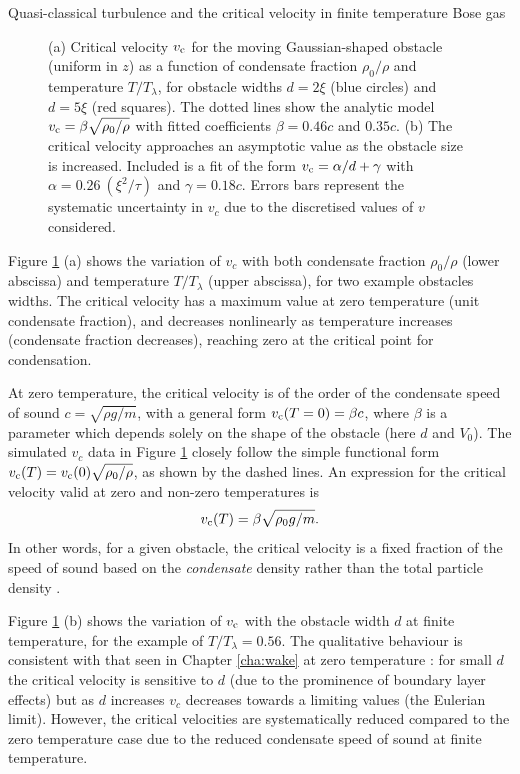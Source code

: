 \begin{chapter}{\label{cha:nonequib}Quasi-classical turbulence and the critical velocity in finite temperature Bose gas}
\begin{figure}
\begin{center}
\end{center}
  \caption{\label{fig:vc-n0}(a) Critical velocity $v_{\rm c}$ for the moving Gaussian-shaped obstacle (uniform in $z$) as a function of condensate fraction $\rho_0/\rho$ and temperature $T/T_\lambda$, for obstacle widths $d=2\xi$ (blue circles) and $d=5\xi$ (red squares). The dotted lines show the analytic model $v_{\rm c}=\beta \sqrt{\rho_0/\rho}$ with fitted coefficients $\beta=0.46c$ and $0.35c$. (b) The critical velocity approaches an asymptotic value as the obstacle size is increased. Included is a fit of the form $v_{\rm c}=\alpha/d+\gamma$ with $\alpha=0.26~(\xi^2/\tau)$ and $\gamma=0.18 c$.  Errors bars represent the systematic uncertainty in $v_c$ due to the discretised values of $v$ considered.}
\end{figure}

Figure \ref{fig:vc-n0} (a) shows the variation of $v_c$ with both condensate fraction $\rho_0/\rho$ (lower abscissa) and temperature $T/T_\lambda$ (upper abscissa), for two example obstacles widths.  The critical velocity has a maximum value at zero temperature (unit condensate fraction), and decreases nonlinearly as temperature increases (condensate fraction decreases), reaching zero at the critical point for condensation.

At zero temperature, the critical velocity is of the order of the condensate speed of sound $c=\sqrt{\rho g/m}$, with a general form $v_{\rm c}(T=0)=\beta c$,
where $\beta$ is a parameter which depends solely on the shape of the
obstacle (here $d$ and $V_0$).  The simulated $v_c$ data in
Figure \ref{fig:vc-n0} closely follow the simple functional form
$v_{\rm c}(T) = v_{\rm c}(0) \sqrt{\rho_0/\rho}$, as shown by the dashed lines.
An expression for the critical velocity valid at zero and non-zero
temperatures is
\begin{equation}
v_{\rm c}(T)=\beta \sqrt{\rho_0 g/m}.
\label{eqn:finite_vc}
\end{equation}
In other words, for a given obstacle, the critical velocity is a fixed
fraction of the speed of sound based on the {\it condensate} density
rather than the total particle density \cite{leadbeater_2003}.

Figure \ref{fig:vc-n0} (b) shows the variation of $v_{\rm c}$ with the obstacle width $d$ at finite temperature, for the example of $T/T_\lambda =0.56$.   The qualitative behaviour is consistent with that seen in Chapter \ref{cha:wake} at zero temperature \cite{huepe00,rica2001,stagg_parker_14}: for small $d$ the critical velocity is sensitive to $d$ (due to the prominence of boundary layer effects) but as $d$ increases $v_c$ decreases towards a limiting values (the Eulerian limit).  However, the critical velocities are systematically reduced compared to the zero temperature case due to the reduced condensate speed of sound at finite temperature.



\end{chapter}
